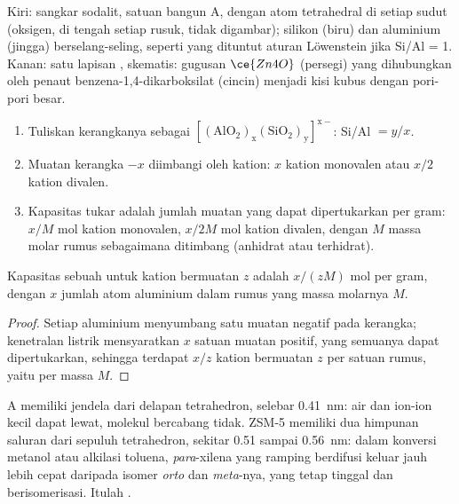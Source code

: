 \begin{omfigure}
{\small Kiri: sangkar sodalit, satuan bangun  A, dengan atom
tetrahedral di setiap sudut (oksigen, di tengah setiap rusuk, tidak
digambar); silikon (biru) dan aluminium (jingga) berselang-seling, seperti yang dituntut aturan Löwenstein
jika Si/Al = 1. Kanan: satu lapisan ,
skematis: gugusan $\ce{Zn4O}$ (persegi) yang dihubungkan oleh penaut benzena-1,4-dikarboksilat
(cincin) menjadi kisi kubus dengan pori-pori besar.}
\end{omfigure}

\begin{method}\label{met:b3:inorganic-materials:zeolite-formula}
\begin{enumerate}
  \item Tuliskan kerangkanya sebagai $\mathrm{[(AlO_2)_x(SiO_2)_y]^{x-}}$: Si/Al $= y/x$.
  \item Muatan kerangka $-x$ diimbangi oleh kation: $x$ kation monovalen atau $x/2$ kation
        divalen.
  \item Kapasitas tukar adalah jumlah muatan yang dapat dipertukarkan per gram:
        $x/M$ mol kation monovalen, $x/2M$ mol kation divalen, dengan $M$
        massa molar rumus sebagaimana ditimbang (anhidrat atau terhidrat).
\end{enumerate}
\end{method}

\begin{proposition}\label{prop:b3:inorganic-materials:exchange-capacity}
Kapasitas sebuah  untuk kation bermuatan $z$ adalah $x/(zM)$ mol per gram,
dengan $x$ jumlah atom aluminium dalam rumus yang massa molarnya $M$.
\end{proposition}

\begin{proof}
Setiap aluminium menyumbang satu muatan negatif pada kerangka; kenetralan listrik
mensyaratkan $x$ satuan muatan positif, yang semuanya dapat dipertukarkan, sehingga
terdapat $x/z$ kation bermuatan $z$ per satuan rumus, yaitu per massa $M$.
\end{proof}

 A memiliki jendela dari delapan tetrahedron, selebar \qty{0.41}{nm}: air dan ion-ion
kecil dapat lewat, molekul bercabang tidak. ZSM-5 memiliki dua himpunan saluran dari sepuluh
tetrahedron, sekitar 0.51 sampai \qty{0.56}{nm}: dalam konversi metanol atau
alkilasi toluena, \textit{para}-xilena yang ramping berdifusi keluar jauh lebih cepat daripada
isomer \textit{orto} dan \textit{meta}-nya, yang tetap tinggal dan berisomerisasi. Itulah .

